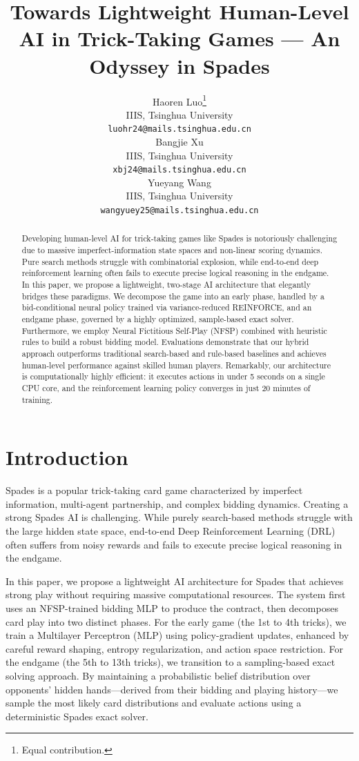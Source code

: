 \documentclass{article}
\title{Towards Lightweight Human-Level AI in Trick-Taking Games — An Odyssey in Spades}
\author{%
  Haoren Luo\thanks{Equal contribution.} \\
  IIIS, Tsinghua University\\
  \texttt{luohr24@mails.tsinghua.edu.cn} \\
  \And
  Bangjie Xu\footnotemark[1] \\
  IIIS, Tsinghua University\\
  \texttt{xbj24@mails.tsinghua.edu.cn} \\
  \And
  Yueyang Wang\footnotemark[1] \\
  IIIS, Tsinghua University\\
  \texttt{wangyuey25@mails.tsinghua.edu.cn} \\
}
\begin{document}
\maketitle


\begin{abstract}
  Developing human-level AI for trick-taking games like Spades is notoriously challenging due to massive imperfect-information state spaces and non-linear scoring dynamics. Pure search methods struggle with combinatorial explosion, while end-to-end deep reinforcement learning often fails to execute precise logical reasoning in the endgame. In this paper, we propose a lightweight, two-stage AI architecture that elegantly bridges these paradigms. We decompose the game into an early phase, handled by a bid-conditional neural policy trained via variance-reduced REINFORCE, and an endgame phase, governed by a highly optimized, sample-based exact solver. Furthermore, we employ Neural Fictitious Self-Play (NFSP) combined with heuristic rules to build a robust bidding model. Evaluations demonstrate that our hybrid approach outperforms traditional search-based and rule-based baselines and achieves human-level performance against skilled human players. Remarkably, our architecture is computationally highly efficient: it executes actions in under 5 seconds on a single CPU core, and the reinforcement learning policy converges in just 20 minutes of training.
\end{abstract}

\section{Introduction}

Spades is a popular trick-taking card game characterized by imperfect information, multi-agent partnership, and complex bidding dynamics. Creating a strong Spades AI is challenging. While purely search-based methods struggle with the large hidden state space, end-to-end Deep Reinforcement Learning (DRL) often suffers from noisy rewards and fails to execute precise logical reasoning in the endgame.

In this paper, we propose a lightweight AI architecture for Spades that achieves strong play without requiring massive computational resources. The system first uses an NFSP-trained bidding MLP to produce the contract, then decomposes card play into two distinct phases. For the early game (the 1st to 4th tricks), we train a Multilayer Perceptron (MLP) using policy-gradient updates, enhanced by careful reward shaping, entropy regularization, and action space restriction. For the endgame (the 5th to 13th tricks), we transition to a sampling-based exact solving approach. By maintaining a probabilistic belief distribution over opponents' hidden hands---derived from their bidding and playing history---we sample the most likely card distributions and evaluate actions using a deterministic Spades exact solver.
\end{document}
